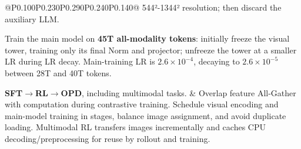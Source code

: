 \begin{longtable}{@{}P{0.100\dimexpr\textwidth-40pt\relax}P{0.230\dimexpr\textwidth-40pt\relax}P{0.290\dimexpr\textwidth-40pt\relax}P{0.240\dimexpr\textwidth-40pt\relax}P{0.140\dimexpr\textwidth-40pt\relax}@{}}
544²-1344² resolution; then discard the auxiliary LLM.\allowbreak{}\par{} Train the main model on {\bfseries 45T all-\allowbreak{}modality tokens}: initially freeze the visual tower, training only its final Norm and projector; unfreeze the tower at a smaller LR during LR decay.\allowbreak{} Main-\allowbreak{}training LR is \(2.6\times 10^{-4}\), decaying to \(2.6\times 10^{-5}\) between 28T and 40T tokens.\allowbreak{}\par{} {\bfseries SFT\(\rightarrow\)RL\(\rightarrow\)OPD}, including multimodal tasks.\allowbreak{} & Overlap feature All-\allowbreak{}Gather with computation during contrastive training.\allowbreak{} Schedule visual encoding and main-\allowbreak{}model training in stages, balance image assignment, and avoid duplicate loading.\allowbreak{} Multimodal RL transfers images incrementally and caches CPU decoding/\allowbreak{}preprocessing for reuse by rollout and training.\allowbreak{} \\
\addlinespace[6pt]

\end{longtable}
